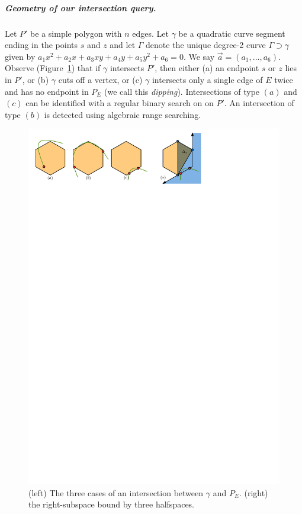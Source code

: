 \documentclass[UKenglish]{lipics-v2019}
\begin{document}
\subparagraph{Geometry of our intersection query.}

Let $P'$ be a simple polygon with $n$ edges. Let $\gamma$ be a quadratic curve segment ending in the points $s$ and $z$ and let $\Gamma$ denote the
unique degree-2 curve $\Gamma \supset \gamma$ given by
$a_1 x^2 + a_2 x + a_3 xy + a_4 y + a_5 y^2 + a_6 = 0$. We say 
$\vec{a} = (a_1, \ldots, a_6)$. Observe (Figure~\ref{fig:intersectionsearch}) that if $\gamma$ intersects
$P'$, then either (a) an endpoint $s$ or $z$ lies in $P'$, or (b) $\gamma$ cuts
off a vertex, or (c) $\gamma$ intersects only a single edge of $E$ twice and has no
endpoint in $P_E$ (we call this \emph{dipping}). Intersections of type $(a)$
and $(c)$ can be identified with a regular binary search on on $P'$. An
intersection of type $(b)$ is detected using algebraic range searching.
%
\begin{figure}[tb]
    \centering
    \includegraphics{../intersectionsearch}
    \caption{(left) The three cases of an intersection between $\gamma$ and $P_E$. (right) the right-subspace bound by three halfspaces.}
    \label{fig:intersectionsearch}
\end{figure}
\end{document}
